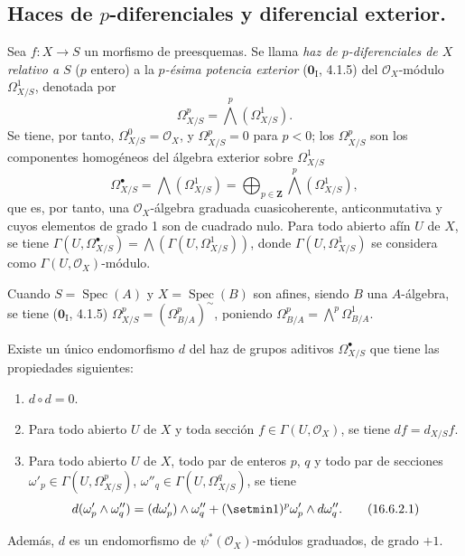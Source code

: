 \subsection{Haces de $p$-diferenciales y diferencial exterior.}
\label{IV.16.6}

\begin{env}[16.6.1]
\label{IV.16.6.1}
Sea $f:X\to S$ un morfismo de preesquemas. Se llama \emph{haz de
$p$-diferenciales de $X$ relativo a $S$} ($p$ entero) a la
\emph{$p$-ésima potencia exterior} ($\mathbf{0}_{\mathrm I}$, 4.1.5) del $\mathcal{O}_X$-módulo
$\varOmega_{X/S}^1$, denotada por
\[
  \varOmega_{X/S}^p=\bigwedge^p(\varOmega_{X/S}^1).
  \tag{16.6.1.1}
  \label{IV.16.6.1.1}
\]
Se tiene, por tanto, $\varOmega_{X/S}^0=\mathcal{O}_X$, y $\varOmega_{X/S}^p=0$ para $p<0$;
los $\varOmega_{X/S}^p$ son los componentes homogéneos del álgebra exterior
sobre $\varOmega_{X/S}^1$
\[
  \varOmega_{X/S}^{\bullet}=\bigwedge(\varOmega_{X/S}^1)
  =\bigoplus_{p\in\mathbf{Z}}\bigwedge^p(\varOmega_{X/S}^1),
  \tag{16.6.1.2}
  \label{IV.16.6.1.2}
\]
que es, por tanto, una $\mathcal{O}_X$-álgebra graduada cuasicoherente,
anticonmutativa y cuyos elementos de grado 1 son de cuadrado nulo. Para todo
abierto afín $U$ de $X$, se tiene
$\Gamma(U,\varOmega_{X/S}^{\bullet})=\bigwedge(\Gamma(U,\varOmega_{X/S}^1))$,
donde $\Gamma(U,\varOmega_{X/S}^1)$ se considera como
$\Gamma(U,\mathcal{O}_X)$-módulo.

Cuando $S=\operatorname{Spec}(A)$ y $X=\operatorname{Spec}(B)$ son
afines, siendo $B$ una $A$-álgebra, se tiene ($\mathbf{0}_{\mathrm I}$, 4.1.5)
$\varOmega_{X/S}^p=(\Omega_{B/A}^p)^{\sim}$, poniendo
$\Omega_{B/A}^p=\bigwedge^p\Omega_{B/A}^1$.
\end{env}

\begin{theorem}[16.6.2]
\label{IV.16.6.2}
Existe un único endomorfismo $d$ del haz de grupos aditivos
$\varOmega_{X/S}^{\bullet}$ que tiene las propiedades siguientes:
\begin{enumerate}
\item[\textup{(i)}] $d\circ d=0$.
\item[\textup{(ii)}] Para todo abierto $U$ de $X$ y toda sección
$f\in\Gamma(U,\mathcal{O}_X)$, se tiene $df=d_{X/S}f$.
\item[\textup{(iii)}] Para todo abierto $U$ de $X$, todo par de enteros $p$, $q$ y
todo par de secciones
$\omega'_p\in\Gamma(U,\varOmega_{X/S}^p)$,
$\omega''_q\in\Gamma(U,\varOmega_{X/S}^q)$, se tiene
\[
  d(\omega'_p\wedge\omega''_q)
  =(d\omega'_p)\wedge\omega''_q
  +(\setmin 1)^p\omega'_p\wedge d\omega''_q.
  \tag{16.6.2.1}
  \label{IV.16.6.2.1}
\]
\end{enumerate}
Además, $d$ es un endomorfismo de $\psi^*(\mathcal{O}_X)$-módulos
graduados, de grado $+1$.
\end{theorem}


